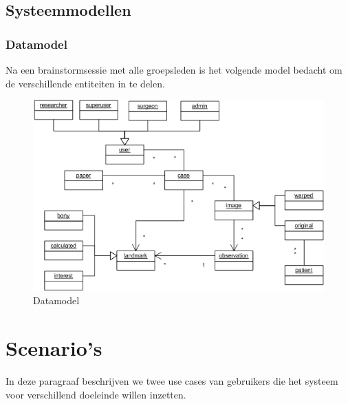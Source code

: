 \subsection{Systeemmodellen}
\subsubsection{Datamodel}
Na een brainstormsessie met alle groepsleden is het volgende model bedacht om de verschillende entiteiten in te delen.
\begin{figure}[htp]
\begin{center}
	\includegraphics[scale=0.65]{brainstorm_klassediagram}
\caption{Datamodel}
\label{default}
\end{center}
\end{figure}


\section{Scenario's}

In deze paragraaf beschrijven we twee use cases van gebruikers die het systeem voor verschillend doeleinde willen inzetten.

